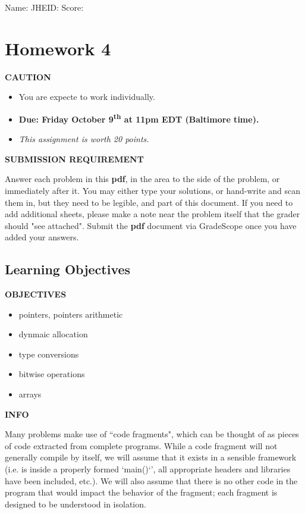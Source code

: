 \documentclass[12pt]{article}
\def \HWNumber {4}
\def \HWDueDate {Friday October 9\textsuperscript{th} at 11pm EDT (Baltimore time)}
\newenvironment{caution}{\par\begin{mdframed}[linewidth=1pt,linecolor=YellowOrange]%
		\begin{list}{}{\leftmargin=0cm}\item[\Large\bcdanger]}
		{\end{list}\end{mdframed}\par}
\newenvironment{danger}{\par\begin{mdframed}[linewidth=1pt,linecolor=Red]%
		\begin{list}{}{\leftmargin=0cm}\item[\Large\bcbombe]}
		{\end{list}\end{mdframed}\par}
\newenvironment{tip}{\par\begin{mdframed}[linewidth=1pt,linecolor=ForestGreen]%
		\begin{list}{}{\leftmargin=0cm}\item[\Large\bclampe]}
		{\end{list}\end{mdframed}\par}
\newenvironment{info}{\par\begin{mdframed}[linewidth=1pt,linecolor=Cerulean]%
		\begin{list}{}{\leftmargin=0cm}\item[\Large\bcinfo]}
		{\end{list}\end{mdframed}\par}
\def \SName {}
\def \JHEID {}
\begin{document}
\noindent Name: \framebox[5.5cm]{\SName\rule{0pt}{12pt}} \hfill
JHEID: \framebox[3cm]{\JHEID\rule{0pt}{12pt}}\hfill
Score: \framebox[2cm]{\rule{0pt}{12pt}}

\section*{Homework \HWNumber}

\begin{caution}
	\textbf{CAUTION}
	
	\begin{itemize}
		\item You are expecte to work individually.
		\item \textbf{Due: \HWDueDate.}
		\item \textit{This assignment is worth 20 points. }
	\end{itemize}
\end{caution}

\begin{danger}
	\textbf{SUBMISSION REQUIREMENT}
	
	Answer each problem in this \textbf{pdf}, in the area to the side of the problem, or immediately after it.  You may either type your solutions, or hand-write and scan them in, but they need to be legible, and part of this document. If you need to add additional sheets, please make a note near the problem itself that the grader should "see attached". Submit the \textbf{pdf} document via GradeScope once you have added your answers.
\end{danger}

\subsection*{Learning Objectives}
\begin{tip}
	\textbf{OBJECTIVES}
	
	\begin{itemize}
		\item pointers, pointers arithmetic
		\item dynmaic allocation
		\item type conversions
		\item bitwise operations
		\item arrays
	\end{itemize}
\end{tip}

\begin{info}
	\textbf{INFO}
	
	Many problems make use of “code fragments", which can be thought of as pieces of code extracted from complete programs. While a code fragment will not generally compile by itself, we will assume that it exists in a sensible framework (i.e. is inside a properly formed `main()`', all appropriate headers and libraries have been included, etc.). We will also assume that there is no other code in the program that would impact the behavior of the fragment; each fragment is designed to be understood in isolation.
\end{info}
\end{document}
